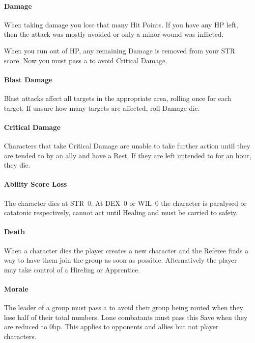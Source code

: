 \documentclass[itdr]{subfiles}
\begin{document}
\paragraph{Damage}
When taking damage you lose that many Hit Points. If you have any HP left, then the attack was mostly avoided or only a minor wound was inflicted.

When you run out of HP, any remaining Damage is removed from your STR score. Now you must pass a  to avoid Critical Damage.

\paragraph{Blast Damage}
Blast attacks affect all targets in the appropriate area, rolling once for each target. If unsure how many targets are affected, roll Damage die.

\paragraph{Critical Damage}
Characters that take Critical Damage are unable to take further action until they are tended to by an ally and have a Rest. If they are left untended to for an hour, they die.

\paragraph{Ability Score Loss}
The character dies at STR~0. At DEX~0 or WIL~0 the character is paralysed or catatonic respectively, cannot act until Healing and must be carried to safety.

\paragraph{Death}
When a character dies the player creates a new character and the Referee finds a way to have them join the group as soon as possible. Alternatively the player may take control of a Hireling or Apprentice.

\paragraph{Morale}
The leader of a group must pass a  to avoid their group being routed when they lose half of their total numbers. Lone combatants must pass this Save when they are reduced to 0hp. This applies to opponents and allies but not player characters.
\end{document}
